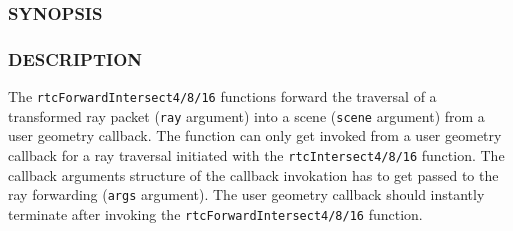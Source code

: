 \subsubsection{SYNOPSIS}\label{synopsis}

\begin{Shaded}
\begin{Highlighting}[]

\OperatorTok{(}
   \OperatorTok{*}\OperatorTok{,}
   \OperatorTok{*}\OperatorTok{,}
\OperatorTok{,}
  \OperatorTok{*}\OperatorTok{,}
   
\OperatorTok{);}

\OperatorTok{(}
   \OperatorTok{*}\OperatorTok{,}
   \OperatorTok{*}\OperatorTok{,}
\OperatorTok{,}
  \OperatorTok{*}\OperatorTok{,}
   
\OperatorTok{);}

\OperatorTok{(}
   \OperatorTok{*}\OperatorTok{,}
   \OperatorTok{*}\OperatorTok{,}
\OperatorTok{,}
  \OperatorTok{*}\OperatorTok{,}
   
\OperatorTok{);}
\end{Highlighting}
\end{Shaded}

\subsubsection{DESCRIPTION}\label{description}

The \texttt{rtcForwardIntersect4/8/16} functions forward the traversal
of a transformed ray packet (\texttt{ray} argument) into a scene
(\texttt{scene} argument) from a user geometry callback. The function
can only get invoked from a user geometry callback for a ray traversal
initiated with the \texttt{rtcIntersect4/8/16} function. The callback
arguments structure of the callback invokation has to get passed to the
ray forwarding (\texttt{args} argument). The user geometry callback
should instantly terminate after invoking the
\texttt{rtcForwardIntersect4/8/16} function.

